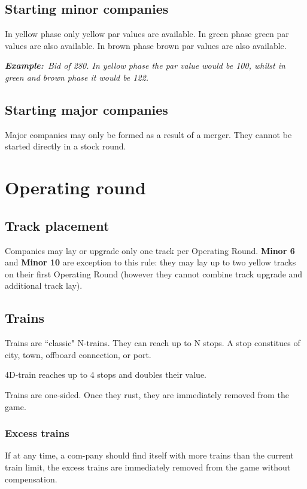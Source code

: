 \documentclass[10pt,a4paper,twocolumn]{article}
\newcommand{\Example}{\textbf{Example:}}
\begin{document}
\subsection{Starting minor companies}
In yellow phase only yellow par values are available. In green phase green par values are also available. In brown phase brown par values are also available.

\textit{\Example~Bid of 280. In yellow phase the par value would be 100, whilst in green and brown phase it would be 122.}

\subsection{Starting major companies}
Major companies may only be formed as a result of a merger. They cannot be started directly in a stock round.


\section{Operating round}

\subsection{Track placement}
Companies may lay or upgrade only one track per Operating Round. \textbf{Minor 6} and \textbf{Minor 10} are exception to this rule: they may lay up to two yellow tracks on their first Operating Round (however they cannot combine track upgrade and additional track lay).


\subsection{Trains}
Trains are ``classic" N-trains. They can reach up to N stops. A stop constitues of city, town, offboard connection, or port.

4D-train reaches up to 4 stops and doubles their value.

Trains are one-sided. Once they rust, they are immediately removed from the game.

\subsubsection{Excess trains}

If at any time, a com-pany  should  find  itself with  more  trains  than  the  current train limit, the excess trains are immediately removed from the game  without  compensation.
\end{document}
